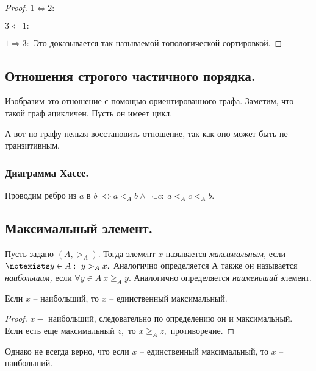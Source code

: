 \begin{proof}
    $1 \Longleftrightarrow 2:$


    $3 \Longleftarrow 1:$


    $1 \Longrightarrow 3:$ Это доказывается так называемой топологической сортировкой.
    
\end{proof}

\subsection{Отношения строгого частичного порядка.}

Изобразим это отношение с помощью ориентированного графа. Заметим, что такой граф ацикличен. Пусть он имеет цикл.

А вот по графу нельзя восстановить отношение, так как оно может быть не транзитивным.


\subsubsection{Диаграмма Хассе.}

Проводим ребро из $a$ в $b$ $\Longleftrightarrow a <_{A} b \wedge \neg \exists c: \ a <_A c <_A b.$ 


\subsection{Максимальный элемент.}

\begin{definition}
    Пусть задано $(A, >_{A}).$ Тогда элемент $x$ называется \textit{максимальным,} если $\notexists y \in A: \ y >_{A} x.$ Аналогично определяется  А также он называется \textit{наибольшим,} если $\forall y \in A \ x \geq_{A} y.$ Аналогично определяется \textit{наименьший} элемент.
\end{definition}

\begin{proposition}
    Если $x$ -- наибольший, то $x$ -- единственный максимальный.
\end{proposition}

\begin{proof}
    $x-$ наибольший, следовательно по определению он и максимальный. Если есть еще максимальный $z,$ то $x \geq_{A} z,$ противоречие.
\end{proof}

\begin{note}
    Однако не всегда верно, что если $x$ -- единственный максимальный, то $x$ -- наибольший.
\end{note} 
